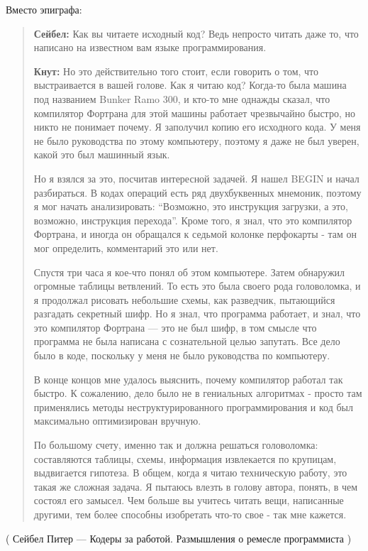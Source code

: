 Вместо эпиграфа:

\begin{framed}
\begin{quotation}

\textbf{Сейбел:} Как вы читаете исходный код? Ведь непросто читать даже то, что написано на известном вам языке программирования.

\textbf{Кнут:} Но это действительно того стоит, если говорить о том, что выстраивается в вашей голове. Как я читаю код? Когда-то была машина под названием Bunker Ramo 300, и кто-то мне однажды сказал, что компилятор Фортрана для этой машины работает чрезвычайно быстро, но никто не понимает почему. Я заполучил копию его исходного кода. У меня не было руководства по этому компьютеру, поэтому я даже не был уверен, какой это был машинный язык.

Но я взялся за это, посчитав интересной задачей. Я нашел BEGIN и начал разбираться. В кодах операций есть ряд двухбуквенных мнемоник, поэтому я мог начать анализировать: “Возможно, это инструкция загрузки, а это, возможно, инструкция перехода”. Кроме того, я знал, что это компилятор Фортрана, и иногда он обращался к седьмой колонке перфокарты - там он мог определить, комментарий это или нет.

Спустя три часа я кое-что понял об этом компьютере. Затем обнаружил огромные таблицы ветвлений. То есть это была своего рода головоломка, и я продолжал рисовать небольшие схемы, как разведчик, пытающийся разгадать секретный шифр. Но я знал, что программа работает, и знал, что это компилятор Фортрана — это не был шифр, в том смысле что программа не была написана с сознательной целью запутать. Все дело было в коде, поскольку у меня не было руководства по компьютеру.

В конце концов мне удалось выяснить, почему компилятор работал так быстро. К сожалению, дело было не в гениальных алгоритмах - просто там применялись методы неструктурированного программирования и код был максимально оптимизирован вручную.

По большому счету, именно так и должна решаться головоломка: составляются таблицы, схемы, информация извлекается по крупицам, выдвигается гипотеза. В общем, когда я читаю техническую работу, это такая же сложная задача. Я пытаюсь влезть в голову автора, понять, в чем состоял его замысел. Чем больше вы учитесь читать вещи, написанные другими, тем более способны изобретать что-то свое - так мне кажется. 

\end{quotation}
\end{framed}

( Сейбел Питер --- Кодеры за работой. Размышления о ремесле программиста )

